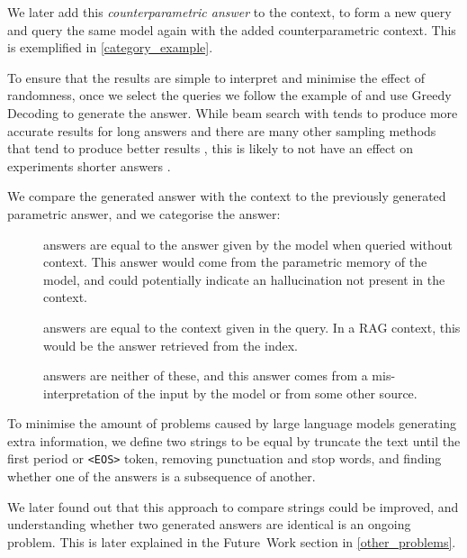 We later add this \emph{counterparametric answer} to the context, to form a new query and query the same model again with the added counterparametric context.
This is exemplified in \cref{category_example}.

To ensure that the results are simple to interpret and minimise the effect of randomness, once we select the queries we follow the example of \citeauthor{ragged} and use Greedy Decoding to generate the answer.
While beam search with tends to produce more accurate results for long answers \citep{sutskever_seq2seqlearning,wu_mltranslation} and there are many other sampling methods that tend to produce better results \citep{text_degeneration}, this is likely to not have an effect on experiments shorter answers \citep{t5}.

We compare the generated answer with the context to the previously generated parametric answer, and we categorise the answer:
\begin{description}
	\item[\Parametric{}] answers are equal to the answer given by the model when queried without context.
		This answer would come from the parametric memory of the model, and could potentially indicate an hallucination not present in the context.
	\item[\Contextual{}] answers are equal to the context given in the query.
		In a RAG context, this would be the answer retrieved from the index.
	\item[\Other] answers are neither of these, and this answer comes from a mis-interpretation of the input by the model or from some other source.
\end{description}

To minimise the amount of problems caused by large language models generating extra information, we define two strings to be equal by truncate the text until the first period or \texttt{<EOS>} token, removing punctuation and stop words, and finding whether one of the answers is a subsequence of another.

We later found out that this approach to compare strings could be improved, and understanding whether two generated answers are identical is an ongoing problem.
This is later explained in the Future~Work section in \cref{other_problems}.

